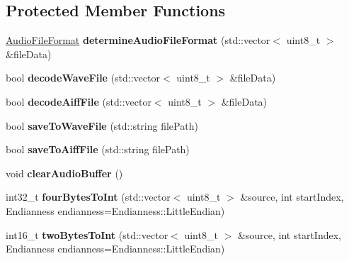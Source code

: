 \subsection*{Protected Member Functions}
\begin{DoxyCompactItemize}
\item 
\mbox{\label{class_audio_file_a0d55bc7ae7b9eb014b93b6baabab8ba7}} 
\hyperlink{_audio_file_8h_ad18559d169602e85d0ad68da6ef8593f}{Audio\+File\+Format} {\bfseries determine\+Audio\+File\+Format} (std\+::vector$<$ uint8\+\_\+t $>$ \&file\+Data)
\item 
\mbox{\label{class_audio_file_afea0b1dbe7788155f249fa3b8a0ad693}} 
bool {\bfseries decode\+Wave\+File} (std\+::vector$<$ uint8\+\_\+t $>$ \&file\+Data)
\item 
\mbox{\label{class_audio_file_a1d68d689475374b830c3e41d7cd54dfa}} 
bool {\bfseries decode\+Aiff\+File} (std\+::vector$<$ uint8\+\_\+t $>$ \&file\+Data)
\item 
\mbox{\label{class_audio_file_a9b1997f2466ec1674ce17bebb9a1ba2d}} 
bool {\bfseries save\+To\+Wave\+File} (std\+::string file\+Path)
\item 
\mbox{\label{class_audio_file_aa6ed89cc0884105f7022c7595c1609ea}} 
bool {\bfseries save\+To\+Aiff\+File} (std\+::string file\+Path)
\item 
\mbox{\label{class_audio_file_a4859348770aba2ab8638a6d2d29490ad}} 
void {\bfseries clear\+Audio\+Buffer} ()
\item 
\mbox{\label{class_audio_file_a5fcde4e965721804e6f60fc38936887f}} 
int32\+\_\+t {\bfseries four\+Bytes\+To\+Int} (std\+::vector$<$ uint8\+\_\+t $>$ \&source, int start\+Index, Endianness endianness=Endianness\+::\+Little\+Endian)
\item 
\mbox{\label{class_audio_file_a279bb7ae95e4b3b9db5e9c9e141b564d}} 
int16\+\_\+t {\bfseries two\+Bytes\+To\+Int} (std\+::vector$<$ uint8\+\_\+t $>$ \&source, int start\+Index, Endianness endianness=Endianness\+::\+Little\+Endian)
\item 
\mbox{\label{class_audio_file_a7446935a450d4aa8da37e5ac1fd4133b}} 

\end{DoxyCompactItemize}
